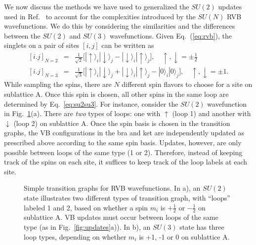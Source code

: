 \documentclass[11pt]{iopart}
\begin{document}
We now discuss the methods we have used to generalized the $SU(2)$ updates used in Ref.~\cite{RVB2,Ju2012} to account for the complexities introduced by the $SU(N)$ RVB wavefunctions.
We do this by considering the similarities and the differences between the $SU(2)$ and $SU(3)$ wavefunctions.
Given Eq.\ (\ref{eq:rvb}), the singlets on a pair of sites $[i,j]$ can be written as
%
\begin{eqnarray}
\left[i.j\right]_{N=2} &=& \frac{1}{\sqrt{2}} \big[ | \uparrow \rangle_i | \downarrow \rangle_j - | \downarrow \rangle_i | \uparrow \rangle_j \big] , \quad \uparrow,\downarrow = \pm \frac{1}{2}\\
\left[i.j\right]_{N=3} &=& \frac{1}{\sqrt{3}} \big[ | \uparrow \rangle_i | \downarrow \rangle_j + | \downarrow \rangle_i | \uparrow \rangle_j - |0\rangle_i |0\rangle_j \big] , \quad \uparrow,\downarrow = \pm 1.
\label{eq:su2su3}
\end{eqnarray}
%
While sampling the spins, there are $N$ different spin flavors to choose for a site on sublattice A.
Once this spin is chosen, all other spins in the same loop are determined by Eq.~\ref{eq:su2su3}.
For instance, consider the $SU(2)$ wavefunction in Fig.~\ref{fig:su2su3graphs}(a).
There are \textit{two} types of loops: one with $\uparrow$ (loop 1) and another with $\downarrow$ (loop 2) on sublattice A.
Once the spin basis is chosen in the transition graphs, the VB configurations in the bra and ket are independently updated as prescribed above according to the same spin basis.
Updates, however, are only possible between loops of the same type (1 or 2).
Therefore, instead of keeping track of the spins on each site, it suffices to keep track of the loop labels at each site.
%
\begin{figure}[t]
 \begin{center}
 \end{center}
 \caption{Simple transition graphs for RVB wavefunctions.  In a), an $SU(2)$ state illustrates two different types of transition graph, with ``loops'' labeled 1 and 2, based on whether a spin $m_i$ is $+\frac{1}{2}$ or $-\frac{1}{2}$ on sublattice A.  VB updates must occur between loops of the same type (as in Fig.~\ref{fig:updates}a)).  In b), an $SU(3)$ state has three loop types, depending on whether $m_i$ is +1, -1 or 0 on sublattice A.
 \label{fig:su2su3graphs} }
 \end{figure}
%
\end{document}
